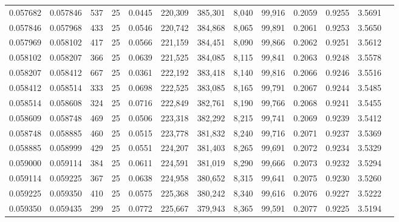 \begin{tabular}{rrrrrrrrrrrrr}
0.057682 & 0.057846 &   537 &  25 &                                     0.0445 & 220,309 & 385,301 &   8,040 &  99,916 & 0.2059 & 0.9255 & 3.5691 \\
0.057846 & 0.057968 &   433 &  25 &                                     0.0546 & 220,742 & 384,868 &   8,065 &  99,891 & 0.2061 & 0.9253 & 3.5650 \\
0.057969 & 0.058102 &   417 &  25 &                                     0.0566 & 221,159 & 384,451 &   8,090 &  99,866 & 0.2062 & 0.9251 & 3.5612 \\
0.058102 & 0.058207 &   366 &  25 &                                     0.0639 & 221,525 & 384,085 &   8,115 &  99,841 & 0.2063 & 0.9248 & 3.5578 \\
0.058207 & 0.058412 &   667 &  25 &                                     0.0361 & 222,192 & 383,418 &   8,140 &  99,816 & 0.2066 & 0.9246 & 3.5516 \\
0.058412 & 0.058514 &   333 &  25 &                                     0.0698 & 222,525 & 383,085 &   8,165 &  99,791 & 0.2067 & 0.9244 & 3.5485 \\
0.058514 & 0.058608 &   324 &  25 &                                     0.0716 & 222,849 & 382,761 &   8,190 &  99,766 & 0.2068 & 0.9241 & 3.5455 \\
0.058609 & 0.058748 &   469 &  25 &                                     0.0506 & 223,318 & 382,292 &   8,215 &  99,741 & 0.2069 & 0.9239 & 3.5412 \\
0.058748 & 0.058885 &   460 &  25 &                                     0.0515 & 223,778 & 381,832 &   8,240 &  99,716 & 0.2071 & 0.9237 & 3.5369 \\
0.058885 & 0.058999 &   429 &  25 &                                     0.0551 & 224,207 & 381,403 &   8,265 &  99,691 & 0.2072 & 0.9234 & 3.5329 \\
0.059000 & 0.059114 &   384 &  25 &                                     0.0611 & 224,591 & 381,019 &   8,290 &  99,666 & 0.2073 & 0.9232 & 3.5294 \\
0.059114 & 0.059225 &   367 &  25 &                                     0.0638 & 224,958 & 380,652 &   8,315 &  99,641 & 0.2075 & 0.9230 & 3.5260 \\
0.059225 & 0.059350 &   410 &  25 &                                     0.0575 & 225,368 & 380,242 &   8,340 &  99,616 & 0.2076 & 0.9227 & 3.5222 \\
0.059350 & 0.059435 &   299 &  25 &                                     0.0772 & 225,667 & 379,943 &   8,365 &  99,591 & 0.2077 & 0.9225 & 3.5194 \\

\end{tabular}
